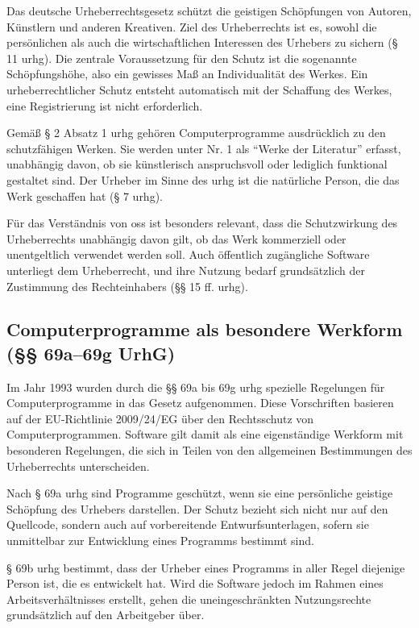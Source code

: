 Das deutsche Urheberrechtsgesetz schützt die geistigen Schöpfungen von Autoren, Künstlern und anderen Kreativen.
Ziel des Urheberrechts ist es, sowohl die persönlichen als auch die wirtschaftlichen Interessen des Urhebers zu sichern (§ 11 \gls{urhg}).
Die zentrale Voraussetzung für den Schutz ist die sogenannte Schöpfungshöhe, also ein gewisses Maß an Individualität des Werkes.
Ein urheberrechtlicher Schutz entsteht automatisch mit der Schaffung des Werkes, eine Registrierung ist nicht erforderlich.

Gemäß § 2 Absatz 1 \gls{urhg} gehören Computerprogramme ausdrücklich zu den schutzfähigen Werken.
Sie werden unter Nr. 1 als \enquote{Werke der Literatur} erfasst, unabhängig davon, ob sie künstlerisch anspruchsvoll oder lediglich funktional gestaltet sind.
Der Urheber im Sinne des \gls{urhg} ist die natürliche Person, die das Werk geschaffen hat (§ 7 \gls{urhg}).

Für das Verständnis von \gls{oss} ist besonders relevant, dass die Schutzwirkung des Urheberrechts unabhängig davon gilt, ob das Werk kommerziell oder unentgeltlich verwendet werden soll.
Auch öffentlich zugängliche Software unterliegt dem Urheberrecht, und ihre Nutzung bedarf grundsätzlich der Zustimmung des Rechteinhabers (§§ 15 ff. \gls{urhg}).


\subsection{Computerprogramme als besondere Werkform (§§ 69a–69g UrhG)}

Im Jahr 1993 wurden durch die §§ 69a bis 69g \gls{urhg} spezielle Regelungen für Computerprogramme in das Gesetz aufgenommen.
Diese Vorschriften basieren auf der EU-Richtlinie 2009/24/EG über den Rechtsschutz von Computerprogrammen.
Software gilt damit als eine eigenständige Werkform mit besonderen Regelungen, die sich in Teilen von den allgemeinen Bestimmungen des Urheberrechts unterscheiden.

Nach § 69a \gls{urhg} sind Programme geschützt, wenn sie eine persönliche geistige Schöpfung des Urhebers darstellen.
Der Schutz bezieht sich nicht nur auf den Quellcode, sondern auch auf vorbereitende Entwurfsunterlagen, sofern sie unmittelbar zur Entwicklung eines Programms bestimmt sind.

§ 69b \gls{urhg} bestimmt, dass der Urheber eines Programms in aller Regel diejenige Person ist, die es entwickelt hat.
Wird die Software jedoch im Rahmen eines Arbeitsverhältnisses erstellt, gehen die uneingeschränkten Nutzungsrechte grundsätzlich auf den Arbeitgeber über.

